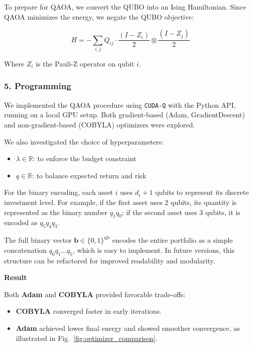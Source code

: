 To prepare for QAOA, we convert the QUBO into an Ising Hamiltonian. Since QAOA minimizes the energy, we negate the QUBO objective:

\begin{equation}
H = -\sum_{i,j} Q_{ij} \cdot \frac{(I - Z_i)}{2} \otimes \frac{(I - Z_j)}{2}
\label{eq:ising_full}
\end{equation}

Where \( Z_i \) is the Pauli-Z operator on qubit \( i \).



\subsubsection*{5. Programming}

We implemented the QAOA procedure using \texttt{CUDA-Q} with the Python API, running on a local GPU setup. Both gradient-based (Adam, GradientDescent) and non-gradient-based (COBYLA) optimizers were explored.

We also investigated the choice of hyperparameters:
\begin{itemize}
    \item \( \lambda \in \mathbb{R} \): to enforce the budget constraint
    \item \( q \in \mathbb{R} \): to balance expected return and risk
\end{itemize}

For the binary encoding, each asset \( i \) uses \( d_i + 1 \) qubits to represent its discrete investment level. For example, if the first asset uses 2 qubits, its quantity is represented as the binary number \( q_1 q_0 \); if the second asset uses 3 qubits, it is encoded as \( q_5 q_4 q_3 \).

The full binary vector \( \mathbf{b} \in \{0, 1\}^{\text{qb}} \) encodes the entire portfolio as a simple concatenation \( q_0 q_1 \dots q_5 \), which is easy to implement. In future versions, this structure can be refactored for improved readability and modularity.



\newpage
{\Huge\bfseries \hspace{2em}Result\par}
{}
\vspace{1.5em}

Both \textbf{Adam} and \textbf{COBYLA} provided favorable trade-offs:
\begin{itemize}
    \item \textbf{COBYLA} converged faster in early iterations.
    \item \textbf{Adam} achieved lower final energy and showed smoother convergence, as illustrated in Fig.~\ref{fig:optimizer_comparison}.
\end{itemize}

